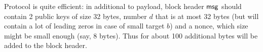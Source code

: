 \documentclass[]{article}
\begin{document}
    Protocol is quite efficient: in additional to payload, block header $\mathsf{msg}$ should
    contain 2 public keys of size 32 bytes, number $d$ that is at most 32 bytes
    (but will contain a lot of leading zeros in case of small target $b$) and a nonce,
    which size might be small enough (say, 8 bytes). Thus for about 100 additional bytes
    will be added to the block header.



    
\end{document}
